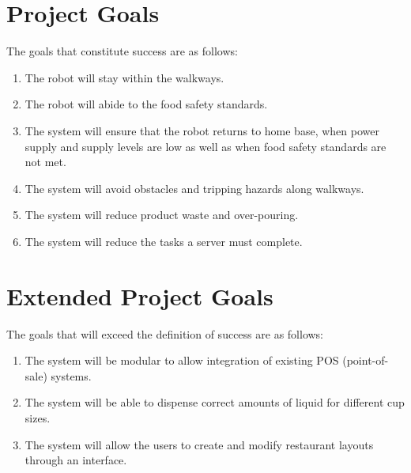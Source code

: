 \documentclass [10pt]{article}
\begin{document}

\section{Project Goals}
The goals that constitute success are as follows: \\

\begin{enumerate}[label=G\arabic*:, ref =\arabic*, leftmargin=0.5in]
	
	\item The robot will stay within the walkways.
	\item The robot will abide to the food safety standards. 
	\item The system will ensure that the robot returns to home base, when power supply and supply levels are low as well as when food safety standards are not met.
	\item The system will avoid obstacles and tripping hazards along walkways.
	\item The system will reduce product waste and over-pouring.
	\item The system will reduce the tasks a server must complete.
	
\end{enumerate}


\section{Extended Project Goals}
The goals that will exceed the definition of success are as follows: \\

\begin{enumerate}[label=G\arabic*:, ref =\arabic*, leftmargin=0.5in]	

	\item The system will be modular to allow integration of existing POS (point-of-sale) systems.
	\item The system will be able to dispense correct amounts of liquid for different cup sizes.
	\item The system will allow the users to create and modify restaurant layouts through an interface.

\end{enumerate}
\end{document}
